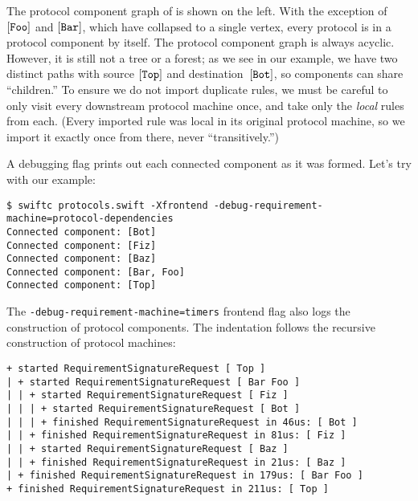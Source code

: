 \documentclass[../generics]{subfiles}
\begin{document}
\begin{wrapfigure}{l}{3.5cm}
\end{wrapfigure}

The protocol component graph of  is shown on the left. With the exception of $[\texttt{Foo}]$ and $[\texttt{Bar}]$, which have collapsed to a single vertex, every protocol is in a protocol component by itself. The protocol component graph is always acyclic. However, it is still not a tree or a forest; as we see in our example, we have two distinct paths with source $[\texttt{Top}]$ and destination~$[\texttt{Bot}]$, so components can share ``children.'' To ensure we do not import duplicate rules, we must be careful to only visit every downstream protocol machine once, and take only the \emph{local} rules from each. (Every imported rule was local in its original protocol machine, so we import it exactly once from there, never ``transitively.'')

A debugging flag prints out each connected component as it was formed. Let's try with our example:
\begin{Verbatim}[fontsize=\footnotesize,numbers=none]
$ swiftc protocols.swift -Xfrontend -debug-requirement-machine=protocol-dependencies
Connected component: [Bot]
Connected component: [Fiz]
Connected component: [Baz]
Connected component: [Bar, Foo]
Connected component: [Top]
\end{Verbatim}

The
\texttt{-debug-requirement-machine=timers} frontend flag also logs the construction of protocol components. The indentation follows the recursive construction of protocol machines:
\begin{Verbatim}[fontsize=\footnotesize,numbers=none]
+ started RequirementSignatureRequest [ Top ]
| + started RequirementSignatureRequest [ Bar Foo ]
| | + started RequirementSignatureRequest [ Fiz ]
| | | + started RequirementSignatureRequest [ Bot ]
| | | + finished RequirementSignatureRequest in 46us: [ Bot ]
| | + finished RequirementSignatureRequest in 81us: [ Fiz ]
| | + started RequirementSignatureRequest [ Baz ]
| | + finished RequirementSignatureRequest in 21us: [ Baz ]
| + finished RequirementSignatureRequest in 179us: [ Bar Foo ]
+ finished RequirementSignatureRequest in 211us: [ Top ]
\end{Verbatim}
\end{document}
